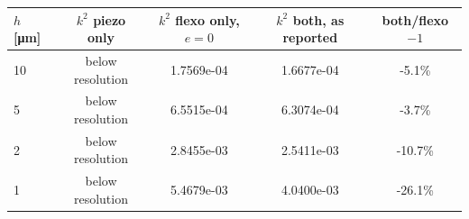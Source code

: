 \begin{tabular}{@{}lcccc@{}}
\toprule
$h$ [\si{\micro\meter}] & $k^2$ piezo only & $k^2$ flexo only, $e=0$ & $k^2$ both, as reported & both/flexo $-1$\\
\midrule
10 & below resolution & 1.7569e-04 & 1.6677e-04 & -5.1\%\\
5 & below resolution & 6.5515e-04 & 6.3074e-04 & -3.7\%\\
2 & below resolution & 2.8455e-03 & 2.5411e-03 & -10.7\%\\
1 & below resolution & 5.4679e-03 & 4.0400e-03 & -26.1\%\\
\bottomrule
\end{tabular}
